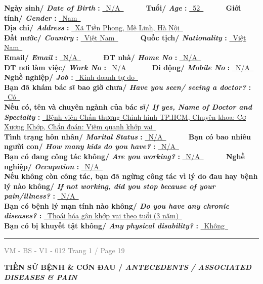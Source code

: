 \documentclass[11pt,a4paper]{article}
\newcommand{\SectionTitle}[2]{%
    \vspace{0.12cm}
    {\bfseries\large #1/ \textit{#2}}\par
    \vspace{0.06cm}
}
\newcommand{\FormFooter}[2]{%
    \vfill
    \hrule
    \vspace{0.08cm}
    \noindent
    \small \textcolor{gray}{VM - BS - V1 - 012} \hfill \small \textcolor{gray}{Trang #1 / Page #2}
}
\begin{document}
\textbf{ Ngày sinh/ \textit{ Date of Birth }: } \underline{~N/A~} ~~~~~ \textbf{ Tuổi/ \textit{ Age }: } \underline{~52~} ~~~~~ \textbf{ Giới tính/ \textit{ Gender }: } \underline{~Nam~}\\[0.12cm]
\textbf{ Địa chỉ/ \textit{ Address }: } \underline{~Xã Tiền Phong, Mê Linh, Hà Nội~}\\[0.12cm]
\textbf{ Đất nước/ \textit{ Country }: } \underline{~Việt Nam~} ~~~~~ \textbf{ Quốc tịch/ \textit{ Nationality }: } \underline{~Việt Nam~}\\[0.12cm]
\textbf{ Email/ \textit{ Email }: } \underline{~N/A~} ~~~~~ \textbf{ ĐT nhà/ \textit{ Home No }: } \underline{~N/A~}\\[0.12cm]
\textbf{ ĐT nơi làm việc/ \textit{ Work No }: } \underline{~N/A~} ~~~~~ \textbf{ Di động/ \textit{ Mobile No }: } \underline{~N/A~}\\[0.12cm]
\textbf{ Nghề nghiệp/ \textit{ Job }: } \underline{~Kinh doanh tự do~}\\[0.12cm]
\textbf{ Bạn đã khám bác sĩ bao giờ chưa/ \textit{ Have you seen/ seeing a doctor? }: } \underline{~Có~}\\[0.12cm]
\textbf{ Nếu có, tên và chuyên ngành của bác sĩ/ \textit{ If yes, Name of Doctor and Specialty }: } \underline{~Bệnh viện Chấn thương Chỉnh hình TP.HCM, Chuyên khoa: Cơ Xương Khớp, Chẩn đoán: Viêm quanh khớp vai~}\\[0.12cm]
\textbf{ Tình trạng hôn nhân/ \textit{ Marital Status }: } \underline{~N/A~} ~~~~~ \textbf{ Bạn có bao nhiêu người con/ \textit{ How many kids do you have? }: } \underline{~N/A~}\\[0.12cm]
\textbf{ Bạn có đang công tác không/ \textit{ Are you working? }: } \underline{~N/A~} ~~~~~ \textbf{ Nghề nghiệp/ \textit{ Occupation }: } \underline{~N/A~}\\[0.12cm]
\textbf{ Nếu không còn công tác, bạn đã ngừng công tác vì lý do đau hay bệnh lý nào không/ \textit{ If not working, did you stop because of your pain/illness? }: } \underline{~N/A~}\\[0.12cm]
\textbf{ Bạn có bệnh lý mạn tính nào không/ \textit{ Do you have any chronic diseases? }: } \underline{~Thoái hóa gân khớp vai theo tuổi (3 năm)~}\\[0.12cm]
\textbf{ Bạn có bị khuyết tật không/ \textit{ Any physical disability? }: } \underline{~Không~}\\[0.12cm]


\FormFooter{ 1 }{ 19 }
\newpage

\SectionTitle{ TIỀN SỬ BỆNH \& CƠN ĐAU }{ ANTECEDENTS / ASSOCIATED DISEASES \& PAIN }
\end{document}
